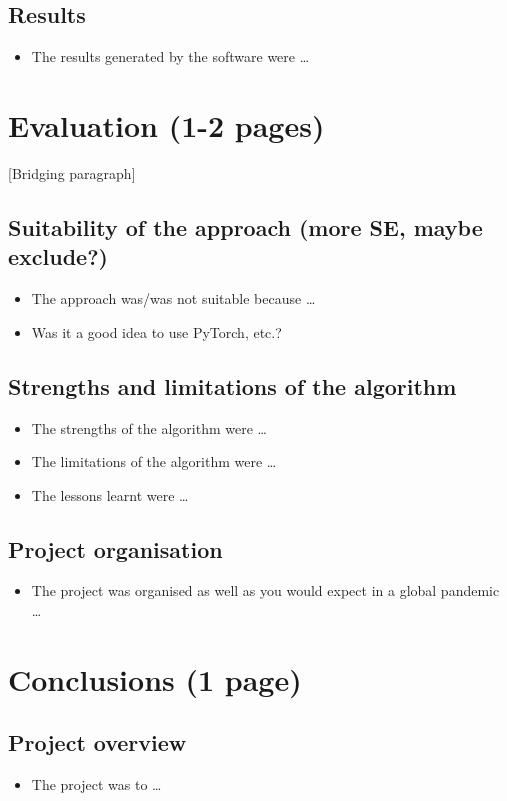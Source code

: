 \documentclass[12pt,a4paper]{article}
\begin{document}
\subsection{Results}
\begin{itemize}
    \item The results generated by the software were \dots
\end{itemize}

\section{Evaluation (1-2 pages)}
[Bridging paragraph]
\subsection{Suitability of the approach (more SE, maybe exclude?)}
\begin{itemize}
    \item The approach was/was not suitable because \dots
    \item Was it a good idea to use PyTorch, etc.?
\end{itemize}

\subsection{Strengths and limitations of the algorithm} 
\begin{itemize}
    \item The strengths of the algorithm were \dots
    \item The limitations of the algorithm were \dots
    \item The lessons learnt were \dots
\end{itemize}

\subsection{Project organisation}
\begin{itemize}
    \item The project was organised as well as you would expect in a global pandemic \dots
\end{itemize}

\section{Conclusions (1 page)}
\subsection{Project overview}
\begin{itemize}
    \item The project was to \dots
\end{itemize}
\end{document}
